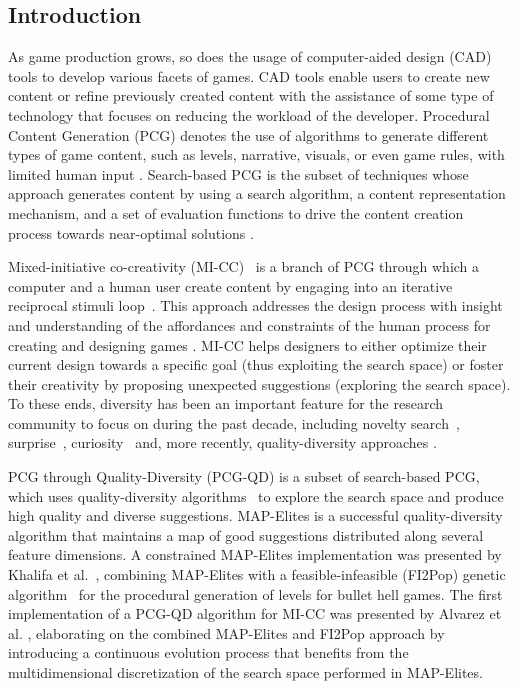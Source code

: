 \subsection{Introduction}

As game production grows, so does the usage of computer-aided design (CAD) tools to develop various facets of games. CAD tools enable users to create new content or refine previously created content with the assistance of some type of technology that focuses on reducing the workload of the developer. Procedural Content Generation (PCG) denotes the use of algorithms to generate different types of game content, such as levels, narrative, visuals, or even game rules, with limited human input . Search-based PCG is the subset of techniques whose approach generates content by using a search algorithm, a content representation mechanism, and a set of evaluation functions to drive the content creation process towards near-optimal solutions . 

Mixed-initiative co-creativity (MI-CC)~ is a branch of PCG through which a computer and a human user create content by engaging into an iterative reciprocal stimuli loop~. This approach addresses the design process with insight and understanding of the affordances and constraints of the human process for creating and designing games . MI-CC helps designers to either optimize their current design towards a specific goal (thus exploiting the search space) or foster their creativity by proposing unexpected suggestions (exploring the search space). To these ends, diversity has been an important feature for the research community to focus on during the past decade, including novelty search~, surprise~, curiosity~ and, more recently, quality-diversity approaches . 

PCG through Quality-Diversity (PCG-QD)  is a subset of search-based PCG, which uses quality-diversity algorithms~ to explore the search space and produce high quality and diverse suggestions. MAP-Elites  is a successful quality-diversity algorithm that maintains a map of good suggestions distributed along several feature dimensions. A constrained MAP-Elites implementation was presented by Khalifa et al.~, combining MAP-Elites with a feasible-infeasible (FI2Pop) genetic algorithm~ for the procedural generation of levels for bullet hell games. The first implementation of a PCG-QD algorithm for MI-CC was presented by Alvarez et al. , elaborating on the combined MAP-Elites and FI2Pop approach by introducing a continuous evolution process that benefits from the multidimensional discretization of the search space performed in MAP-Elites.

